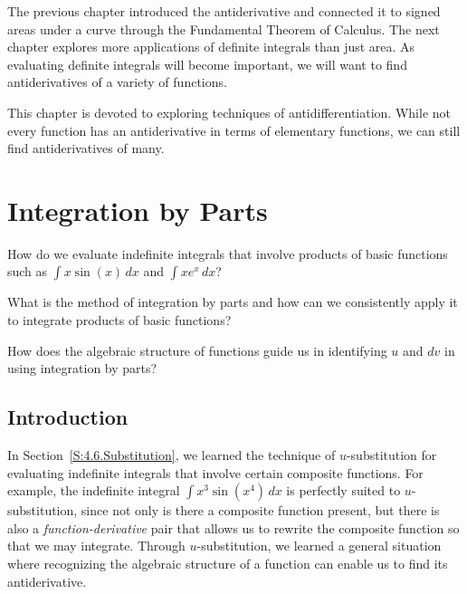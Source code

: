 The previous chapter introduced the antiderivative and connected it to signed areas under a curve through the Fundamental Theorem of Calculus. The next chapter explores more applications of definite integrals than just area. As evaluating definite integrals will become important, we will want to find antiderivatives of a variety of functions.

This chapter is devoted to exploring techniques of antidifferentiation. While not every function has an antiderivative in terms of elementary functions, %
 we can still find antiderivatives of many.

\section{Integration by Parts} \label{S:5.1.Parts}

\begin{goals}
\item How do we evaluate indefinite integrals that involve products of basic functions such as $\int x \sin(x) \, dx$ and $\int x e^x \, dx$?
\item What is the method of integration by parts and how can we consistently apply it to integrate products of basic functions?
\item How does the algebraic structure of functions guide us in identifying $u$ and $dv$ in using integration by parts?
\end{goals}

\subsection*{Introduction}

In Section~\ref{S:4.6.Substitution}, we learned the technique of $u$-substitution for evaluating indefinite integrals that involve certain composite functions.  For example, the indefinite integral $\int x^3 \sin(x^4) \, dx$ is perfectly suited to $u$-substitution, since not only is there a composite function present, but there is also a {\em function-derivative} pair that allows us to rewrite the composite function so that we may integrate.  Through $u$-substitution, we learned a general situation where recognizing the algebraic structure of a function can enable us to find its antiderivative.  

